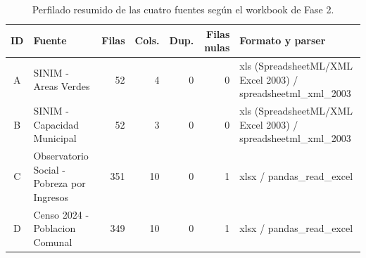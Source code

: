 \begin{table}[htbp]
\centering
\footnotesize
\caption{Perfilado resumido de las cuatro fuentes según el workbook de Fase 2.}
\begin{tabular}{|c|p{3.3cm}|r|r|r|r|p{4.0cm}|}
\hline
ID & Fuente & Filas & Cols. & Dup. & Filas nulas & Formato y parser \\
\hline
A & SINIM - Areas Verdes & 52 & 4 & 0 & 0 & xls (SpreadsheetML/XML Excel 2003) / spreadsheetml\_xml\_2003 \\
B & SINIM - Capacidad Municipal & 52 & 3 & 0 & 0 & xls (SpreadsheetML/XML Excel 2003) / spreadsheetml\_xml\_2003 \\
C & Observatorio Social - Pobreza por Ingresos & 351 & 10 & 0 & 1 & xlsx / pandas\_read\_excel \\
D & Censo 2024 - Poblacion Comunal & 349 & 10 & 0 & 1 & xlsx / pandas\_read\_excel \\
\hline
\end{tabular}
\end{table}
